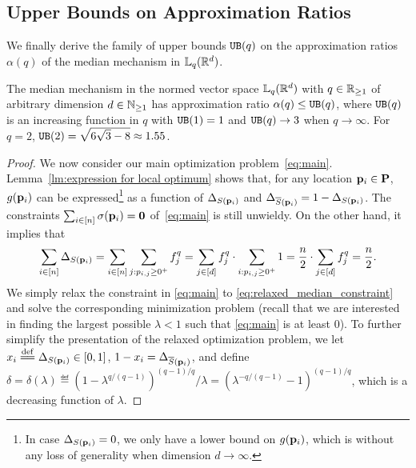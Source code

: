 \subsection{Upper Bounds on Approximation Ratios}
\label{sec:upper_global}
We finally derive the family of upper bounds $\UB(q)$ on the approximation ratios $\alpha(q)$ of the median mechanism in $\lqnorm(\reals^{d})$.
\begin{theorem}
    \label{thm:UB}
    The median mechanism in the normed vector space $\lqnorm(\reals^{d})$ with $q\in\reals_{\ge 1}$ of arbitrary dimension $d\in\nats_{\ge 1}$ has
    approximation ratio $\alpha(q)\le\UB(q)$, where $\UB(q)$ is an increasing function in $q$ with $\UB(1)=1$ and $\UB(q)\to 3$ when $q\to\infty$.
    For $q=2$, $\UB(2)=\sqrt{6\sqrt{3}-8}\approx 1.55$.
\end{theorem}
\begin{proof} We now consider our main optimization problem~\eqref{eq:main}.
Lemma~\ref{lm:expression for local optimum} shows that, for any location $\loci\in\locs$, $g(\loci)$ can be expressed\footnote{In case $\energy[S(\loci)]=0$, we only have a lower bound on $g(\loci)$, which is without any loss of generality when dimension $d\to\infty$.} as a function of $\energy[S(\loci)]$ and $\energy[\overline{S}(\loci)]=1-\energy[S(\loci)]$. 
The constraints $\sum_{i\in [n]}\sigma(\loci) = \vect{0}$ of~\eqref{eq:main} is still unwieldy. On the other hand, it implies that
\begin{equation}
    \label{eq:relaxed_median_constraint}
    \sum\limits_{i\in[n]}\energy[S(\loci)]=
    \sum_{i\in[n]}\sum_{j:p_{i,j}\ge 0^+}f_j^q
    =\sum_{j\in[d]}f_j^q\cdot\sum_{i:p_{i,j}\ge 0^+}1
    =\frac{n}{2}\cdot\sum_{j\in[d]}f_j^q=\frac{n}{2}.
\end{equation}
We simply relax the constraint in \eqref{eq:main} to \eqref{eq:relaxed_median_constraint} and solve the corresponding minimization problem (recall that we are interested in finding the largest possible $\lambda<1$ such that \eqref{eq:main} is at least $0$). To further simplify the presentation of the relaxed optimization problem, we let $x_i\eqdef\energy[S(\loci)]\in[0,1]$, $1-x_i=\energy[\overline{S}(\loci)]$, and define $\delta=\delta(\lambda)\eqdef\left(1-\lambda^{q/(q-1)}\right)^{(q-1)/q}/\lambda=\left(\lambda^{-q/(q-1)}-1\right)^{(q-1)/q}$, which is a decreasing function of $\lambda$.

\end{proof}
